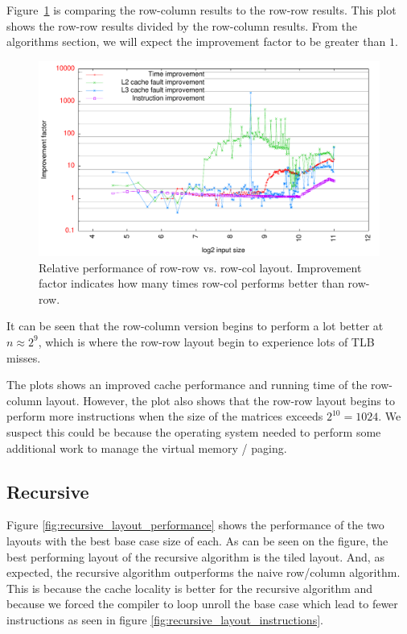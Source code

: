 Figure~\ref{fig:rowcol_vs_rowrow} is comparing the row-column results
to the row-row results. This plot shows the row-row results divided by
the row-column results. From the algorithms section, we will expect
the improvement factor to be greater than $1$.
\begin{figure}[h!]
  \centering
  \includegraphics[width=\textwidth]{plots/rowcol_vs_rowrow}
  \caption{Relative performance of row-row vs. row-col
    layout. Improvement factor indicates how many times row-col
    performs better than row-row.}
  \label{fig:rowcol_vs_rowrow}
\end{figure}

It can be seen that the row-column version begins to perform a lot
better at $n \approx 2^9$, which is where the row-row layout begin to
experience lots of TLB misses.

The plots shows an improved cache performance and running time of the
row-column layout. However, the plot also shows that the row-row
layout begins to perform more instructions when the size of the
matrices exceeds $2^{10} = 1024$. We suspect this could be because the
operating system needed to perform some additional work to manage the
virtual memory / paging.

\subsection{Recursive}

Figure \ref{fig:recursive_layout_performance} shows the performance of the two layouts with the best base case size of each. As can be seen on the figure, the best performing layout of the recursive algorithm is the tiled layout. And, as expected, the recursive algorithm outperforms the naive row/column algorithm. This is because the cache locality is better for the recursive algorithm and because we forced the compiler to loop unroll the base case which lead to fewer instructions as seen in figure \ref{fig:recursive_layout_instructions}.

